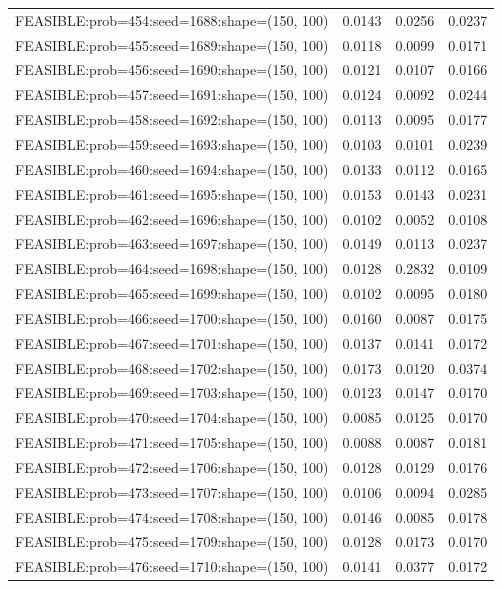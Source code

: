 \begin{longtable}{lccc}
FEASIBLE:prob=454:seed=1688:shape=(150, 100) &   0.0143 & 0.0256 & 0.0237 \\
FEASIBLE:prob=455:seed=1689:shape=(150, 100) &   0.0118 & 0.0099 & 0.0171 \\
FEASIBLE:prob=456:seed=1690:shape=(150, 100) &   0.0121 & 0.0107 & 0.0166 \\
FEASIBLE:prob=457:seed=1691:shape=(150, 100) &   0.0124 & 0.0092 & 0.0244 \\
FEASIBLE:prob=458:seed=1692:shape=(150, 100) &   0.0113 & 0.0095 & 0.0177 \\
FEASIBLE:prob=459:seed=1693:shape=(150, 100) &   0.0103 & 0.0101 & 0.0239 \\
FEASIBLE:prob=460:seed=1694:shape=(150, 100) &   0.0133 & 0.0112 & 0.0165 \\
FEASIBLE:prob=461:seed=1695:shape=(150, 100) &   0.0153 & 0.0143 & 0.0231 \\
FEASIBLE:prob=462:seed=1696:shape=(150, 100) &   0.0102 & 0.0052 & 0.0108 \\
FEASIBLE:prob=463:seed=1697:shape=(150, 100) &   0.0149 & 0.0113 & 0.0237 \\
FEASIBLE:prob=464:seed=1698:shape=(150, 100) &   0.0128 & 0.2832 & 0.0109 \\
FEASIBLE:prob=465:seed=1699:shape=(150, 100) &   0.0102 & 0.0095 & 0.0180 \\
FEASIBLE:prob=466:seed=1700:shape=(150, 100) &   0.0160 & 0.0087 & 0.0175 \\
FEASIBLE:prob=467:seed=1701:shape=(150, 100) &   0.0137 & 0.0141 & 0.0172 \\
FEASIBLE:prob=468:seed=1702:shape=(150, 100) &   0.0173 & 0.0120 & 0.0374 \\
FEASIBLE:prob=469:seed=1703:shape=(150, 100) &   0.0123 & 0.0147 & 0.0170 \\
FEASIBLE:prob=470:seed=1704:shape=(150, 100) &   0.0085 & 0.0125 & 0.0170 \\
FEASIBLE:prob=471:seed=1705:shape=(150, 100) &   0.0088 & 0.0087 & 0.0181 \\
FEASIBLE:prob=472:seed=1706:shape=(150, 100) &   0.0128 & 0.0129 & 0.0176 \\
FEASIBLE:prob=473:seed=1707:shape=(150, 100) &   0.0106 & 0.0094 & 0.0285 \\
FEASIBLE:prob=474:seed=1708:shape=(150, 100) &   0.0146 & 0.0085 & 0.0178 \\
FEASIBLE:prob=475:seed=1709:shape=(150, 100) &   0.0128 & 0.0173 & 0.0170 \\
FEASIBLE:prob=476:seed=1710:shape=(150, 100) &   0.0141 & 0.0377 & 0.0172 \\

\end{longtable}
